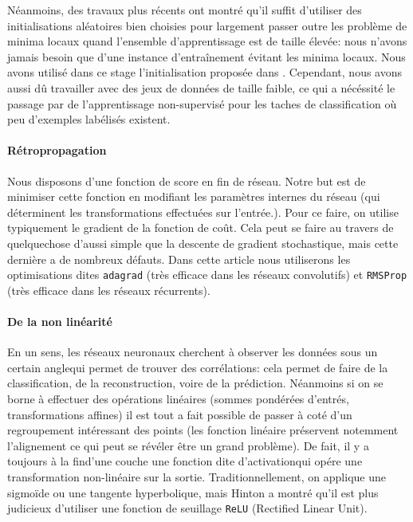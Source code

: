 \documentclass[a4paper,11pt]{article}
\begin{document}
Néanmoins, des travaux plus récents ont montré qu'il suffit d'utiliser des
initialisations aléatoires bien choisies pour largement passer outre les problème
de minima locaux quand l'ensemble d'apprentissage est de taille élevée: nous n'avons jamais besoin que d'une instance d'entraînement
évitant les minima locaux. Nous avons utilisé dans ce stage l'initialisation
proposée dans . Cependant, nous avons aussi dû travailler avec des jeux de
données de taille faible, ce qui a nécéssité le passage par de l'apprentissage
non-supervisé pour les taches de classification où peu d'exemples labélisés existent.

\paragraph{Rétropropagation}

Nous disposons d'une fonction de score en fin de réseau. Notre but est de
minimiser cette fonction en modifiant les paramètres internes du réseau (qui
déterminent les transformations effectuées sur l'entrée.). Pour ce faire, on
utilise typiquement le gradient de la fonction de coût. Cela peut se faire au
travers de quelquechose d'aussi simple que la descente de gradient stochastique, mais cette
dernière a de nombreux défauts. Dans cette article nous utiliserons les
optimisations dites \texttt{adagrad} (très efficace dans les réseaux
convolutifs) et \texttt{RMSProp} (très efficace dans les réseaux récurrents).

\paragraph{De la non linéarité}

En un sens, les réseaux neuronaux cherchent à observer les données \og sous un
certain angle\fg qui permet de trouver des corrélations: cela permet de faire de
la classification, de la reconstruction, voire de la prédiction. Néanmoins si on
se borne à effectuer des opérations linéaires (sommes pondérées
d'entrés, transformations affines) il est tout a fait possible de passer à coté
d'un regroupement intéressant des points (les fonction linéaire préservent
notemment l'alignement ce qui peut se révéler être un grand problème). De fait,
il y a toujours \og à la fin\fg d'une couche une fonction dite \og
d'activation\fg qui opére une transformation non-linéaire sur la sortie.
Traditionnellement, on applique une sigmoïde ou une tangente hyperbolique, mais
Hinton a montré qu'il est plus judicieux d'utiliser une fonction de seuillage
\texttt{ReLU} (Rectified Linear Unit).
\end{document}
